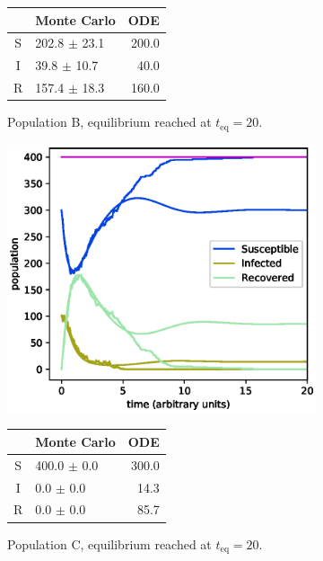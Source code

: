 \documentclass[a4paper,10pt,twocolumn]{article}
\begin{document}
\begin{figure}
\begin{subfigure}{.5\textwidth}
	\small
	\begin{tabular}{c l r}
  &    Monte Carlo     &  ODE  \\\hline
S &  202.8 $\pm$  23.1 &  200.0 \\
I &   39.8 $\pm$  10.7 &   40.0 \\
R &  157.4 $\pm$  18.3 &  160.0 \\\hline
	\end{tabular}
	\caption{Population B, equilibrium reached at $t_\mathrm{eq}=20$.}
	\label{fig:aB}
\end{subfigure} 
\begin{subfigure}{.5\textwidth}
	\centering
	\includegraphics[width=\linewidth]{a4b3c05_1.eps}
	\small
	\begin{tabular}{c l r}
  &    Monte Carlo     &  ODE  \\\hline
S &  400.0 $\pm$   0.0 &  300.0 \\
I &    0.0 $\pm$   0.0 &   14.3 \\
R &    0.0 $\pm$   0.0 &   85.7 \\\hline
	\end{tabular}
	\caption{Population C, equilibrium reached at $t_\mathrm{eq}=20$.}
	\label{fig:aC}
\end{subfigure}%
\begin{subfigure}{.5\textwidth}
	\centering

\end{subfigure}
\end{figure}
\end{document}
